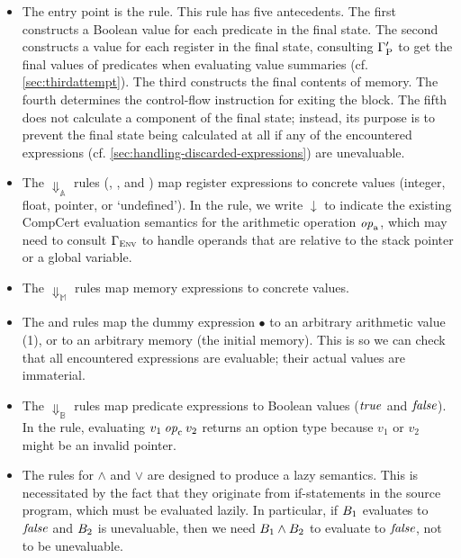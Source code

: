 {\begin{itemize}

\item The entry point is the  rule. This rule has five antecedents. The first constructs a Boolean value for each predicate in the final state. The second constructs a value for each register in the final state, consulting $\Gamma'_{\mathrm{P}}$ to get the final values of predicates when evaluating value summaries (cf. \cref{sec:thirdattempt}). The third constructs the final contents of memory. The fourth determines the control-flow instruction for exiting the block. The fifth does not calculate a component of the final state; instead, its purpose is to prevent the final state being calculated at all if any of the encountered expressions (cf. \cref{sec:handling-discarded-expressions}) are unevaluable.

\item The $\Downarrow_{\mathbb{A}}$ rules (, , and ) map register expressions to concrete values (integer, float, pointer, or `undefined'). In the  rule, we write $\downarrow$ to indicate the existing CompCert evaluation semantics for the arithmetic operation $\mathit{op}_{\mathrm{a}}$, which may need to consult $\Gamma_{\mathrm{\textsc{Env}}}$ to handle operands that are relative to the stack pointer or a global variable.

\item The $\Downarrow_{\mathbb{M}}$ rules map memory expressions to concrete values.

\item The  and  rules map the dummy expression $\bullet$ to an arbitrary arithmetic value (1), or to an arbitrary memory (the initial memory). This is so we can check that all encountered expressions are evaluable; their actual values are immaterial.

\item The $\Downarrow_{\mathbb{B}}$ rules map predicate expressions to Boolean values ($\mathit{true}$ and $\mathit{false}$). In the  rule, evaluating $v_1\mathbin{\mathit{op}_{\mathrm{c}}}v_2$ returns an option type because $v_1$ or $v_2$ might be an invalid pointer.

\item The rules for $\land$ and $\lor$ are designed to produce a lazy semantics. This is necessitated by the fact that they originate from if-statements in the source program, which must be evaluated lazily.
In particular, if $B_1$ evaluates to $\mathit{false}$ and $B_2$ is unevaluable, then we need $B_1 \land B_2$ to evaluate to $\mathit{false}$, not to be unevaluable.


\end{itemize}}

